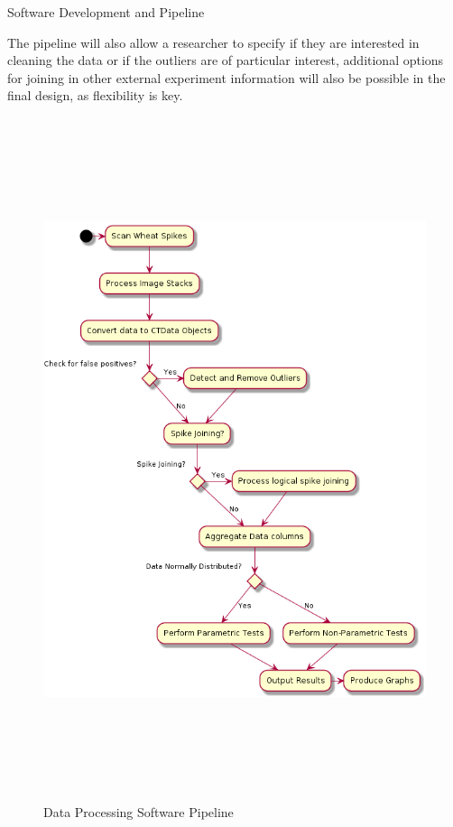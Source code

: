 \documentclass[final]{beamer}
\begin{document}
\begin{frame}{}
\begin{textblock}{28}
\begin{block}{Software Development and Pipeline}
\begin{multicols}{2}
      \vspace{0.5cm}

      The pipeline will also allow a researcher to specify if they are interested in cleaning the data
      or if the outliers are of particular interest, additional options for joining in other external
      experiment information will also be possible in the final design, as flexibility is key.
      
        \columnbreak

        \begin{figure}[htb]
          \centering
          \includegraphics[width=13.5cm, height=20cm]{flow.png}
          \caption{\label{fig:flow} Data Processing Software Pipeline }
        \end{figure}        
        

\end{multicols}
\end{block}
\end{textblock}
\end{frame}
\end{document}
